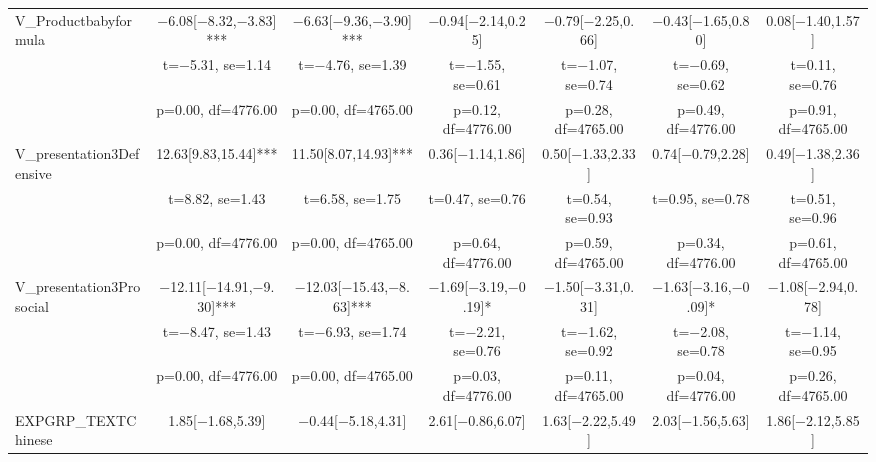 \documentclass[]{report}
\begin{document}
\begin{table}
{\begin{tabular}[t]{lcccccc}
		V\_Productbabyformula & \num{-6.08}[\num{-8.32},\num{-3.83}]*** & \num{-6.63}[\num{-9.36},\num{-3.90}]*** & \num{-0.94}[\num{-2.14},\num{0.25}] & \num{-0.79}[\num{-2.25},\num{0.66}] & \num{-0.43}[\num{-1.65},\num{0.80}] & \num{0.08}[\num{-1.40},\num{1.57}]\\
		& t=\num{-5.31}, se=\num{1.14} & t=\num{-4.76}, se=\num{1.39} & t=\num{-1.55}, se=\num{0.61} & t=\num{-1.07}, se=\num{0.74} & t=\num{-0.69}, se=\num{0.62} & t=\num{0.11}, se=\num{0.76}\\
		& p=\num{0.00}, df=\num{4776.00} & p=\num{0.00}, df=\num{4765.00} & p=\num{0.12}, df=\num{4776.00} & p=\num{0.28}, df=\num{4765.00} & p=\num{0.49}, df=\num{4776.00} & p=\num{0.91}, df=\num{4765.00}\\
		V\_presentation3Defensive & \num{12.63}[\num{9.83},\num{15.44}]*** & \num{11.50}[\num{8.07},\num{14.93}]*** & \num{0.36}[\num{-1.14},\num{1.86}] & \num{0.50}[\num{-1.33},\num{2.33}] & \num{0.74}[\num{-0.79},\num{2.28}] & \num{0.49}[\num{-1.38},\num{2.36}]\\
		& t=\num{8.82}, se=\num{1.43} & t=\num{6.58}, se=\num{1.75} & t=\num{0.47}, se=\num{0.76} & t=\num{0.54}, se=\num{0.93} & t=\num{0.95}, se=\num{0.78} & t=\num{0.51}, se=\num{0.96}\\
		& p=\num{0.00}, df=\num{4776.00} & p=\num{0.00}, df=\num{4765.00} & p=\num{0.64}, df=\num{4776.00} & p=\num{0.59}, df=\num{4765.00} & p=\num{0.34}, df=\num{4776.00} & p=\num{0.61}, df=\num{4765.00}\\
		V\_presentation3Prosocial & \num{-12.11}[\num{-14.91},\num{-9.30}]*** & \num{-12.03}[\num{-15.43},\num{-8.63}]*** & \num{-1.69}[\num{-3.19},\num{-0.19}]* & \num{-1.50}[\num{-3.31},\num{0.31}] & \num{-1.63}[\num{-3.16},\num{-0.09}]* & \num{-1.08}[\num{-2.94},\num{0.78}]\\
		& t=\num{-8.47}, se=\num{1.43} & t=\num{-6.93}, se=\num{1.74} & t=\num{-2.21}, se=\num{0.76} & t=\num{-1.62}, se=\num{0.92} & t=\num{-2.08}, se=\num{0.78} & t=\num{-1.14}, se=\num{0.95}\\
		& p=\num{0.00}, df=\num{4776.00} & p=\num{0.00}, df=\num{4765.00} & p=\num{0.03}, df=\num{4776.00} & p=\num{0.11}, df=\num{4765.00} & p=\num{0.04}, df=\num{4776.00} & p=\num{0.26}, df=\num{4765.00}\\
		EXPGRP\_TEXTChinese & \num{1.85}[\num{-1.68},\num{5.39}] & \num{-0.44}[\num{-5.18},\num{4.31}] & \num{2.61}[\num{-0.86},\num{6.07}] & \num{1.63}[\num{-2.22},\num{5.49}] & \num{2.03}[\num{-1.56},\num{5.63}] & \num{1.86}[\num{-2.12},\num{5.85}]\\

\end{tabular}}
\end{table}
\end{document}
